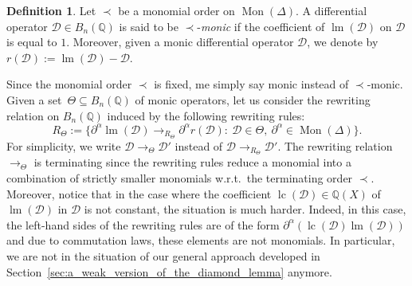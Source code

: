 \documentclass[10pt]{easychair}
\theoremstyle{definition}
\newtheorem{definition}[theorem]{Definition}
\newcommand\D{\mathcal{D}}
\DeclareMathOperator{\lm}{lm}
\DeclareMathOperator{\lc}{lc}
\newcommand\Q{\mathbb{Q}}
\newcommand\Weyl[1]{B_{#1}(\Q)}
\newcommand\monBasis{\Mon(\Delta)}
\DeclareMathOperator{\Mon}{Mon}
\newcommand\rewTheta{\to_\Theta}
\newcommand\RTheta{R_{\Theta}}
\begin{document}
\begin{definition}
  Let $\prec$ be a monomial order on $\monBasis$. A differential
  operator $\D\in\Weyl{n}$ is said to be $\prec$-{\em monic} if the
  coefficient of $\lm(\D)$ on $\D$ is equal to $1$. Moreover, given a
  monic differential operator $\D$, we denote by $r(\D):=\lm(\D)-\D$.
\end{definition}
\smallskip

Since the monomial order $\prec$ is fixed, me simply say monic instead of
$\prec$-monic. Given a set~$\Theta\subseteq\Weyl{n}$ of monic operators,
let us consider the rewriting relation on $\Weyl{n}$ induced by the
following rewriting rules: 
\begin{equation}\label{equ:rewTheta}
  \RTheta:=\Big\{\partial^\alpha\lm(\D)\to_{\RTheta}\partial^\alpha
  r(\D):\ \D\in\Theta,\ \partial^\alpha\in\Mon(\Delta)\Big\}.
\end{equation}
For simplicity, we write $\D\rewTheta\D'$ instead of
$\D\to_{R_\Theta}\D'$. The rewriting relation $\rewTheta$ is terminating
since the rewriting rules reduce a monomial into a combination of
strictly smaller monomials w.r.t.\ the terminating order $\prec$.
Moreover, notice that in the case where the coefficient $\lc(\D)\in\Q(X)$
of $\lm(\D)$ in $\D$ is not constant, the situation is much harder.
Indeed, in this case, the left-hand sides of the rewriting rules are of
the form $\partial^\alpha(\lc(\D)\lm(\D))$ and due to commutation laws,
these elements are not monomials. In particular, we are not in the
situation of our general approach developed in  
Section~\ref{sec:a_weak_version_of_the_diamond_lemma} anymore.
\medskip
\end{document}
